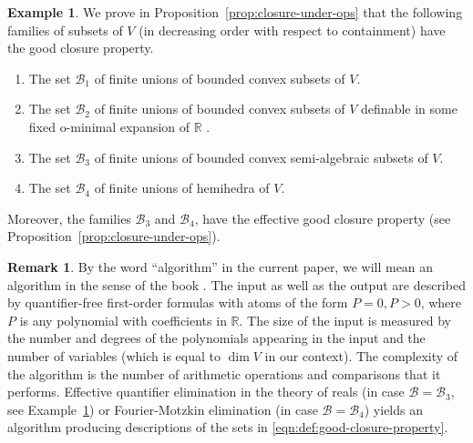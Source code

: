 \documentclass[10pt]{amsart}
\theoremstyle{plain}
\theoremstyle{definition}
\newtheorem{example}[lemma]{Example}
\newtheorem{remark}[lemma]{Remark}
\begin{document}
\begin{example}
\label{eg:closure}
We prove in Proposition~\ref{prop:closure-under-ops} that the following families of subsets of $V$ (in decreasing order with respect to containment) 
have the good closure property.

\begin{enumerate}[(1)]
\item 
\label{itemlabel:eg:closure:1}
The set $\mathcal{B}_1$ of finite unions of
bounded convex subsets of $V$.
\item 
\label{itemlabel:eg:closure:2}
The set  $\mathcal{B}_2$ of finite unions of
bounded convex subsets of $V$ definable in
some fixed o-minimal expansion of $\mathbb{R}$ \cite{Dries-book}.

\item 
\label{itemlabel:eg:closure:3}
The set $\mathcal{B}_3$ of finite unions of
bounded convex semi-algebraic subsets of $V$.


\item 
\label{itemlabel:eg:closure:4}
The set $\mathcal{B}_4$ of finite unions of
hemihedra of $V$.
\end{enumerate}

Moreover, the families $\mathcal{B}_3$ and $\mathcal{B}_4$,  
have the effective good closure property (see Proposition~\ref{prop:closure-under-ops}). 
\end{example}  

\begin{remark}
\label{rem:BSS}
    By the word ``algorithm''  in the current paper, we will mean 
    an algorithm in the sense of the book \cite{BPRbook2}. The input as well as the output  
    are described by 
    quantifier-free first-order formulas with atoms of the form $P=0, P > 0$, where $P$ is any polynomial with coefficients in $\mathbb{R}$. 
    The size of the input is measured by the number and degrees of the polynomials appearing in the input and the number of variables (which is equal to $\dim V$ in our context).
    The complexity of the algorithm
    is the number of arithmetic operations and comparisons that it performs. 
    Effective quantifier elimination in the theory of reals \cite[Chapter 14]{BPRbook2} (in case $\mathcal{B} = \mathcal{B}_3$, see
     Example~\ref{eg:closure})
    or Fourier-Motzkin elimination
    (in case $\mathcal{B} = \mathcal{B}_4$)
    yields an algorithm producing descriptions of the sets in \eqref{eqn:def:good-closure-property}.
\end{remark}
\end{document}
